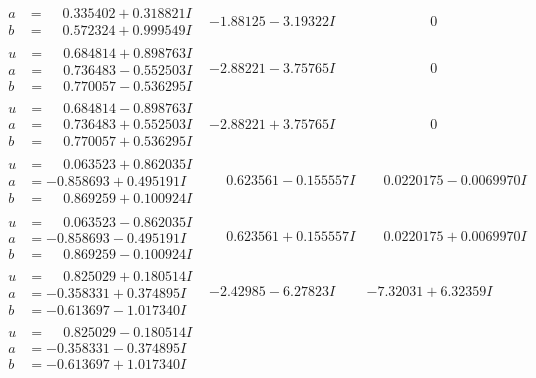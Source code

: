 \documentclass[1p]{elsarticle_modified}
\theoremstyle{definition}
\begin{document}
$$\begin{array}{c|c|c}
\begin{aligned}
a &= \phantom{-}0.335402 + 0.318821 I \\
b &= \phantom{-}0.572324 + 0.999549 I\end{aligned}
 & -1.88125 - 3.19322 I & \phantom{-0.000000 } 0 \\ \hline\begin{aligned}
u &= \phantom{-}0.684814 + 0.898763 I \\
a &= \phantom{-}0.736483 - 0.552503 I \\
b &= \phantom{-}0.770057 - 0.536295 I\end{aligned}
 & -2.88221 - 3.75765 I & \phantom{-0.000000 } 0 \\ \hline\begin{aligned}
u &= \phantom{-}0.684814 - 0.898763 I \\
a &= \phantom{-}0.736483 + 0.552503 I \\
b &= \phantom{-}0.770057 + 0.536295 I\end{aligned}
 & -2.88221 + 3.75765 I & \phantom{-0.000000 } 0 \\ \hline\begin{aligned}
u &= \phantom{-}0.063523 + 0.862035 I \\
a &= -0.858693 + 0.495191 I \\
b &= \phantom{-}0.869259 + 0.100924 I\end{aligned}
 & \phantom{-}0.623561 - 0.155557 I & \phantom{-}0.0220175 - 0.0069970 I \\ \hline\begin{aligned}
u &= \phantom{-}0.063523 - 0.862035 I \\
a &= -0.858693 - 0.495191 I \\
b &= \phantom{-}0.869259 - 0.100924 I\end{aligned}
 & \phantom{-}0.623561 + 0.155557 I & \phantom{-}0.0220175 + 0.0069970 I \\ \hline\begin{aligned}
u &= \phantom{-}0.825029 + 0.180514 I \\
a &= -0.358331 + 0.374895 I \\
b &= -0.613697 - 1.017340 I\end{aligned}
 & -2.42985 - 6.27823 I & -7.32031 + 6.32359 I \\ \hline\begin{aligned}
u &= \phantom{-}0.825029 - 0.180514 I \\
a &= -0.358331 - 0.374895 I \\
b &= -0.613697 + 1.017340 I\end{aligned}

\end{array}$$
\end{document}
